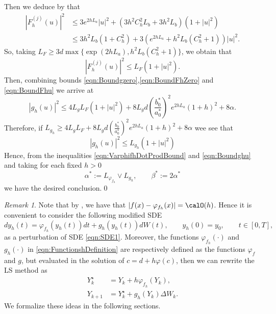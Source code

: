 \documentclass[sort&compress, preprint]{elsarticle}
\theoremstyle{definition}
\theoremstyle{plain}%
\theoremstyle{remark}
\newtheorem{remark}{Remark}[section]
\newcommand{\SM}{LS\xspace}
\begin{document}
\begin{pf}
\begin{dmath*}
	\end{dmath*}
	Then we deduce by  that
	\begin{align*}
		|F_h^{(j)}(u)|^2 
		&\leq
			3 e^{2h L_a }|u|^2 + (3 h^2 C_h^2 L_b + 3h^ 2L_b) (1+|u|^2) \\
		&\leq
			3 h^2 L_b (1 + C_h^2)   +
			3 \left(
				 e^{2 h L_a} + h^2 L_b (C_h^2 + 1 ) 
			\right)|u|^2.	
	\end{align*}
	So, taking 
	$
		L_F\geq 3 d \max\{ \exp(2h L_a),  h^2 L_b(C_h^2+1)\}
	$,
	we obtain that
	\begin{equation}\label{eqn:BoundFhu}
		|F_h^{(j)}(u)|^2
		\leq
			L_F(1+|u|^2).	
	\end{equation}
	Then, combining bounds \eqref{eqn:Boundgzero},\eqref{eqn:BoundFhZero} and \eqref{eqn:BoundFhu} we arrive at
	\begin{equation*}
		|g_h(u)|^2 \leq
			4 L_g L_F(1+|u|^2)
			+ 8 L_g d
			\left(
				\frac{b_0^*}{a_0^*}
			\right)^2
			e^{2h L_a} (1+h)^2
			+8 \alpha.
	\end{equation*}
	Therefore, if
	$
		 L_{g_h} 
		 \geq 
			  4 L_g L_F + 8 L_g d
			  \left(
				  \frac{b_0^*}{a_0^*}
			  \right)^2
			  e^{2h L_a} (1+h)^2
			  +8 \alpha		  
	$
	wee see that
	\begin{equation}\label{eqn:Boundghu}
		|g_h(u)|^2
		\leq
			L_{g_h}(1+|u|^2)		
	\end{equation}
	Hence, from the inequalities \eqref{eqn:VarphifhDotProdBound} and \eqref{eqn:Boundghu} and taking
	for each fixed $h>0$
	$$
		\alpha^* := L_{\varphi_{f_h}}\vee L_{g_h}, \qquad
		\beta^* := 2\alpha^*
	$$ 
	 we have the desired conclusion.\qed
\end{pf}
%
\begin{remark}\label{rmk:PertrubedSDE}
	Note that by , we have that $|f(x)-\varphi_{f_h}(x)|=\calO(h)$.
	Hence it is convenient to  consider the following modified SDE
	\begin{equation*} %
		dy_h(t)= \varphi_{f_h}(y_h(t))dt +g_h(y_h(t))dW(t),
		\qquad y_h(0)=y_0,  \qquad t\in [0,T],
	\end{equation*}
	as a perturbation of SDE \eqref{eqn:SDE1}. 
	Moreover, the functions $\varphi_{f_h}(\cdot)$ and $g_h(\cdot)$ in \eqref{eqn:FunctionshDefinition} are
	respectively defined as the functions $\varphi_{f}$ and $g$, but  evaluated in the solution of $c=d + h\varphi(c)$, 
	then we can rewrite the \SM method  as
	\begin{align*}
		Y_k^{\star} &= Y_k + h \varphi_{f_h}(Y_k),\\
		Y_{k+1} &= Y_k^{\star} + g_h(Y_k)\Delta W_k.
	\end{align*}
	We formalize these ideas in the following sections.
\end{remark}
%
\end{document}
